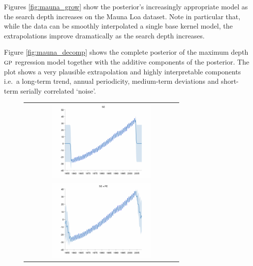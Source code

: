 \documentclass[twoside]{article}
\begin{document}
Figures \ref{fig:mauna_grow} show the posterior's increasingly appropriate model as the search depth increases on the Mauna Loa dataset.
Note in particular that, while the data can be smoothly interpolated a single base kernel model, the extrapolations improve dramatically as the search depth increases.

Figure \ref{fig:mauna_decomp} shows the complete posterior of the maximum depth ${\textsc{gp}}$ regression model together with the additive components of the posterior.
The plot shows a very plausible extrapolation and highly interpretable components i.e.~a long-term trend, annual periodicity, medium-term deviations and short-term serially correlated `noise'.

\begin{figure}[h!]
\centering
\newcommand{\wmg}{8cm}  %
\newcommand{\hmg}{4cm}  %
\begin{tabular}{c}
 \includegraphics[width=\wmg,height=\hmg]{../figures/decomposition/03-mauna2003_max_level_0/03-mauna2003_all} \\ 
 \includegraphics[width=\wmg,height=\hmg]{../figures/decomposition/03-mauna2003_max_level_1/03-mauna2003_all} \\

\end{tabular}
\end{figure}
\end{document}
